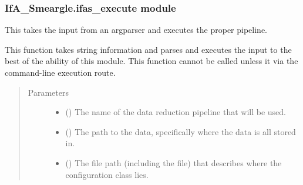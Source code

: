 \documentclass[letterpaper,10pt,english]{sphinxmanual}
\begin{document}
\subsubsection{IfA\_Smeargle.ifas\_execute module}
\label{\detokenize{python_docstrings/IfA_Smeargle.ifas_execute:module-IfA_Smeargle.ifas_execute}}\label{\detokenize{python_docstrings/IfA_Smeargle.ifas_execute:ifa-smeargle-ifas-execute-module}}\label{\detokenize{python_docstrings/IfA_Smeargle.ifas_execute::doc}}

\begin{fulllineitems}
\label{\detokenize{python_docstrings/IfA_Smeargle.ifas_execute:IfA_Smeargle.ifas_execute.execute_ifas_smeargle}}
This takes the input from an argparser and executes the proper
pipeline.

This function takes string information and parses and executes the input
to the best of the ability of this module. This function cannot be called
unless it via the command-line execution route.
\begin{quote}\begin{description}
\item[{Parameters}] \leavevmode\begin{itemize}
\item {} 
 () \textendash{} The name of the data reduction pipeline that will be used.

\item {} 
 () \textendash{} The path to the data, specifically where the data is all stored in.

\item {} 
 () \textendash{} The file path (including the file) that describes where the
configuration class lies.


\end{itemize}
\end{description}
\end{quote}
\end{fulllineitems}
\end{document}
